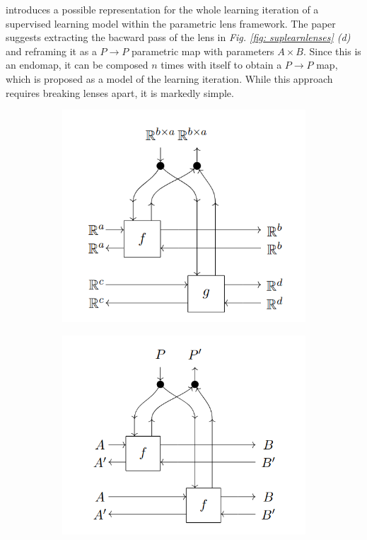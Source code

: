 \documentclass[11pt,a4paper,openright,twoside]{report}
\theoremstyle{plain}
\theoremstyle{definition}
\begin{document}
\cite{cruttwell2022categorical} introduces a possible representation for the whole learning iteration of a supervised learning model within the parametric lens framework. The paper suggests extracting the bacward pass of the lens in \textit{Fig. \ref{fig: suplearnlenses} (d)} and reframing it as a $P \to P$ parametric map with parameters $A \times B$. Since this is an endomap, it can be composed $n$ times with itself to obtain a $P \to P$ map, which is proposed as a model of the learning iteration. While this approach requires breaking lenses apart, it is markedly simple.

\begin{figure}[h]
  \begin{center}
    \begin{subfigure}{0.3\textwidth}
      \includegraphics[width=\textwidth]{figures/weight_tying.png}
      \caption{}
    \end{subfigure}
    \begin{subfigure}{0.3\textwidth}
      \includegraphics[width=\textwidth]{figures/batching.png}

\end{subfigure}
\end{center}
\end{figure}
\end{document}
